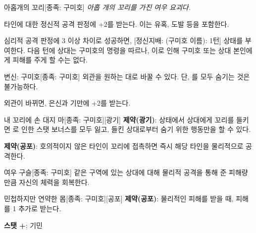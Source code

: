 \documentclass{report}
\begin{document}
	\begin{story}{아홉개의 꼬리}{[종족: 구미호]}
		\textit{아홉 개의 꼬리를 가진 여우 요괴다.}
		
		타인에 대한 정신적 공격 판정에 +2를 받는다. 이는 유혹, 도발 등을 포함한다.
		
		심리적 공격 판정에 3 이상 차이로 성공하면, [정신지배: (구미호 이름): 1턴] 상태를 부여한다. 다음 턴에 상대는 구미호의 명령을 따르나, 이로 인해 구미호 또는 상대 본인에게 피해를 주게 할 수는 없다.
		
	\end{story}
	
	\begin{story}{변신: 구미호}{[종족: 구미호]}
		외관을 원하는 대로 바꿀 수 있다. 단, 를 모두 숨기는 것은 불가능하다.
		
		외관이 바뀌면, 은신과 기만에 +2를 받는다.
		
	\end{story}
	
	\begin{story}{내 꼬리에 손 대지 마}{[종족: 구미호][광기]}
		\textbf{제약(광기)}:  상태에서 상대에게 꼬리를 들키면 로 인한 스탯 보너스를 모두 잃고, 들킨 상대로부터 숨기 위한 행동만을 할 수 있다.
		
		\smallskip
		
		\textbf{제약(공포)}: 호의적이지 않은 타인이 꼬리에 접촉하면 즉시 해당 타인을 물리적으로 공격한다.
		
	\end{story}
	
	\begin{story}{여우 구슬}{[종족: 구미호]}
		같은 구역에 있는 상대에 대해 물리적 공격을 통해 준 피해량만큼 자신의 체력을 회복한다.
		
	\end{story}
	
	\begin{story}{민첩하지만 연약한 몸}{[종족: 구미호][공포]}
		\textbf{제약(공포)}: 물리적인 피해를 받을 때, 피해를 1 추가로 받는다.
		
		\smallskip
		
		\textbf{스탯 +}: 기민
		
	\end{story}
	
\end{document}
